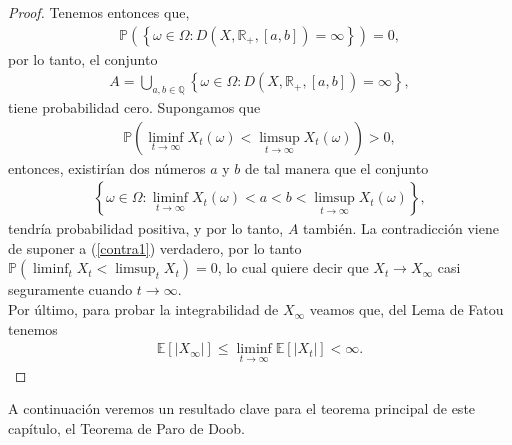 \begin{proof}
Tenemos entonces que, 
\begin{align*}
\mathbb{P} \left( \left\{ \omega \in \Omega : D(X, \mathbb{R}_{+}, [a, b]) = \infty \right\} \right) = 0,
\end{align*}
por lo tanto, el conjunto
\begin{align*}
A = \bigcup_{a, b \in \mathbb{Q}} \left\{ \omega \in \Omega : D(X, \mathbb{R}_{+}, [a, b]) = \infty \right\},
\end{align*}
tiene probabilidad cero. Supongamos que 
\begin{align}
\mathbb{P} \left( \liminf_{t \rightarrow \infty} X_t(\omega) < \limsup_{t \rightarrow \infty} X_t(\omega) \right) > 0, \label{contra1}
\end{align}
entonces, existirían dos números $a$ y $b$ de tal manera que el conjunto
\begin{align*}
\left\{ \omega \in \Omega : \liminf_{t \rightarrow \infty} X_t(\omega) < a < b < \limsup_{t \rightarrow \infty} X_t(\omega) \right\},
\end{align*}
tendría probabilidad positiva, y por lo tanto, $A$ también. La contradicción viene de suponer a (\ref{contra1}) verdadero, por lo tanto $\mathbb{P} \left( \liminf_{t} X_t < \limsup_{t} X_t \right) = 0$, lo cual quiere decir que $X_t \rightarrow X_{\infty}$ casi seguramente cuando $t \rightarrow \infty$. \\

Por último, para probar la integrabilidad de $X_{\infty}$ veamos que, del Lema de Fatou tenemos
\begin{align*}
\mathbb{E} \left[ \big| X_{\infty} \big| \right] \leq \liminf_{t \rightarrow \infty} \mathbb{E} \left[ \big| X_t \big| \right] < \infty.
\end{align*}
\end{proof}

A continuación veremos un resultado clave para el teorema principal de este capítulo, el Teorema de Paro de Doob.


